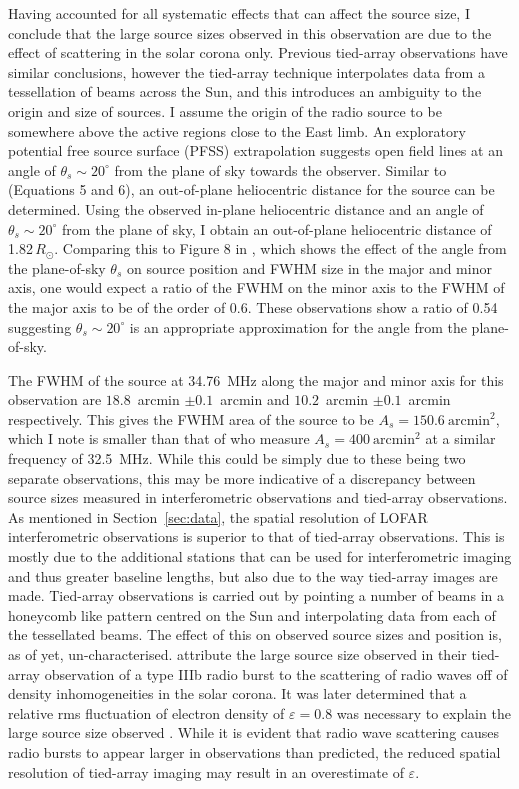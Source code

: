 Having accounted for all systematic effects that can affect the source size, I conclude that the large source sizes observed in this observation are due to the effect of scattering in the solar corona only. Previous tied-array observations have similar conclusions, however the tied-array technique interpolates data from a tessellation of beams across the Sun, and this introduces an ambiguity to the origin and size of sources. 
I assume the origin of the radio source to be somewhere above the active regions close to the East limb. 
An exploratory potential free source surface (PFSS) extrapolation suggests open field lines at an angle of $ \theta_s {\sim} 20^\circ$ from the plane of sky towards the observer. Similar to \cite{Chrysaphi2018} (Equations 5 and 6), an out-of-plane heliocentric distance for the source can be determined. Using the observed in-plane heliocentric distance and an angle of $ \theta_s {\sim} 20^\circ$ from the plane of sky, I obtain an out-of-plane heliocentric distance of 1.82$\, R_\odot$. Comparing this to Figure 8 in \cite{Kontar2019}, which shows the effect of the angle from the plane-of-sky $\theta_s$ on source position and FWHM size in the major and minor axis, one would expect a ratio of the FWHM on the minor axis to the FWHM of the major axis to be of the order of 0.6. These observations show a ratio of 0.54 suggesting $ \theta_s {\sim} 20^\circ$ is an appropriate approximation for the angle from the plane-of-sky.

The FWHM of the source at 34.76~MHz along the major and minor axis for this observation are $18.8$~arcmin $\pm 0.1$~arcmin and $10.2$~arcmin $\pm 0.1$~arcmin respectively. This gives the FWHM area of the source to be $A_s = 150.6~\mbox{arcmin}^2$, which I note is smaller than that of \cite{Kontar2017} who measure $A_s = 400~\mbox{arcmin}^2$ at a similar frequency of 32.5~MHz. While this could be simply due to these being two separate observations, this may be more indicative of a discrepancy between source sizes measured in interferometric observations and tied-array observations.
As mentioned in Section~\ref{sec:data}, the spatial resolution of LOFAR interferometric observations is superior to that of tied-array observations. This is mostly due to the additional stations that can be used for interferometric imaging and thus greater baseline lengths, but also due to the way tied-array images are made. Tied-array observations is carried out by pointing a number of beams in a honeycomb like pattern centred on the Sun and interpolating data from each of the tessellated beams. The effect of this on observed source sizes and position is, as of yet, un-characterised. \cite{Kontar2017} attribute the large source size observed in their tied-array observation of a type IIIb radio burst to the scattering of radio waves off of density inhomogeneities in the solar corona. It was later determined that a relative rms fluctuation of electron density of $\varepsilon = 0.8$ was necessary to explain the large source size observed \cite{Kontar2019}. While it is evident that radio wave scattering causes radio bursts to appear larger in observations than predicted, the reduced spatial resolution of tied-array imaging may result in an overestimate of $\varepsilon$.

